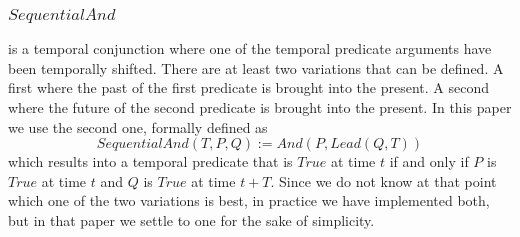 \documentclass[runningheads]{llncs}
\newcommand{\SP}{\;\;\;}
\newcommand{\TTrue}{\textit{True}}
\newcommand{\TAnd}{\textit{And}}
\newcommand{\TSeqAnd}{\textit{SequentialAnd}}
\newcommand{\TBSeqAnd}{\textit{BackSequentialAnd}}
\newcommand{\TFSeqAnd}{\textit{ForeSequentialAnd}}
\newcommand{\TLag}{\textit{Lag}}
\newcommand{\TLead}{\textit{Lead}}
\begin{document}
\subsubsection{$\TSeqAnd$} is a temporal conjunction where one of the
temporal predicate arguments have been temporally shifted.  There are
at least two variations that can be defined.  A first where the past
of the first predicate is brought into the present.  A second where
the future of the second predicate is brought into the present.  In
this paper we use the second one, formally defined as
$$\TSeqAnd(T, P, Q) := \TAnd(P, \TLead(Q, T))$$
which results into a temporal predicate that is $\TTrue$ at time $t$
if and only if $P$ is $\TTrue$ at time $t$ and $Q$ is $\TTrue$ at time
$t+T$.  Since we do not know at that point which one of the two
variations is best, in practice we have implemented both, but in that
paper we settle to one for the sake of simplicity.

\end{document}
